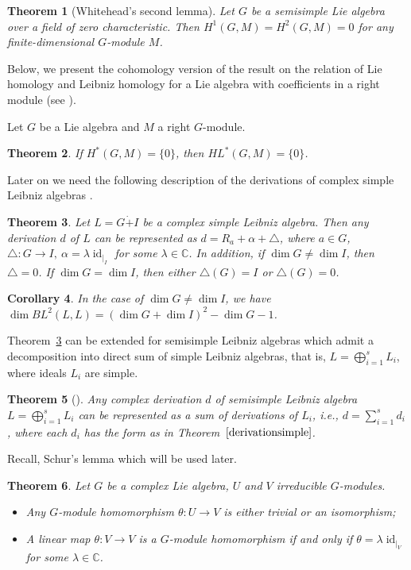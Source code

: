\documentclass[12pt,reqno]{amsart}
\newtheorem{thm}{Theorem}[section]
\newtheorem{cor}[thm]{Corollary}
\numberwithin{equation}{section}
\begin{document}
\begin{thm}[Whitehead's second lemma] \label{whitehead}  Let $G$ be a semisimple Lie algebra over a field of zero characteristic.
 Then $H^1(G,M)=H^2(G,M)=0$ for any finite-dimensional $G$-module $M$.
\end{thm}

Below, we present the cohomology version of the result on the relation of Lie homology and Leibniz homology for a Lie algebra with coefficients
 in a right module (see \cite[ Corollary 1.3]{Pir}).

Let $G$ be a Lie algebra and $M$  a right $G$-module.

\begin{thm} \label{thmpirashvili} If $H^*(G,M)=\{0\}$, then $HL^*(G,M)=\{0\}$.
\end{thm}

Later on we need the following description of the derivations of complex simple Leibniz algebras \cite{RMO}.

\begin{thm} \label{derivationsimple} Let $L=G\dot{+}I$ be a complex simple Leibniz algebra. Then any derivation $d$ of $L$
 can be represented as $d=R_a+\alpha+\triangle$, where $a\in G$, $\triangle \colon G\rightarrow I, \ \alpha = \lambda \operatorname{id}_{|_I}$ for some $\lambda \in \mathbb{C}$.
  In addition, if $\dim G\neq \dim I$, then $\triangle=0$. If $\dim G=\dim I$, then either $\triangle(G)=I$ or $\triangle(G)=0$.
\end{thm}

\begin{cor} \label{dimbl2sl2} In the case of $\dim G \neq \dim I$, we have $\dim BL^2(L,L)=(\dim G+\dim I)^2-\dim G -1$.

\end{cor}

Theorem~\ref{derivationsimple} can be extended for semisimple Leibniz algebras which admit a decomposition into direct sum of simple Leibniz algebras,
 that is, $L=\bigoplus_{i=1}^s L_i$, where ideals $L_i$ are simple.
\begin{thm} [\cite{RMO}] \label{derivationsemisimple} Any complex derivation $d$ of semisimple Leibniz algebra $L=\bigoplus_{i=1}^s L_i$
  can be represented as a sum of derivations of $L_i$, i.e., $d=\sum\limits_{i=1}^s d_i$, where each $d_i$ has the form as in Theorem~$\ref{derivationsimple}$.
\end{thm}

Recall, Schur's lemma which will be used later.
\begin{thm} \label{Schur} Let $G$ be a complex Lie algebra, $U$
and $V$ irreducible $G$-modules.
\begin{itemize}
\item[(i)] Any $G$-module homomorphism $\theta \colon U \rightarrow V$ is either  trivial or an isomorphism;
\item[(ii)] A linear map $\theta \colon V \rightarrow V$  is a $G$-module homomorphism if and only
if $\theta = \lambda \operatorname{id}_{|_V}$ for some $\lambda \in \mathbb{C}$.
\end{itemize}
\end{thm}
\end{document}
